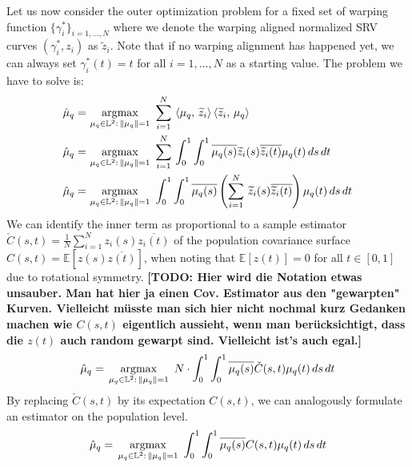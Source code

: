 Let us now consider the outer optimization problem for a fixed set of warping function $\{\gamma_i^*\}_{i=1,\dots,N}$ where we denote the warping aligned normalized SRV curves $(\gamma_i^*, z_i)$ as $\widetilde{z}_i$.
Note that if no warping alignment has happened yet, we can always set $\gamma_i^*(t) = t$ for all $i=1,\dots,N$ as a starting value.
The problem we have to solve is:
\begin{align*}
  \hat\mu_q = &\, \operatorname*{argmax}_{\mu_q \in \mathbb{L}^2:\,\lVert\mu_q\rVert = 1}\,\,
    \sum_{i=1}^N \, \left\langle \mu_q,\, \widetilde z_i \right\rangle \left\langle \widetilde z_i,\, \mu_q \right\rangle \\
  \hat\mu_q = &\, \operatorname*{argmax}_{\mu_q \in \mathbb{L}^2:\,\lVert\mu_q\rVert = 1}\,\,
    \sum_{i=1}^N \, \int_0^1 \int_0^1 \overline{\mu_q (s)} \widetilde z_i(s) \overline{\widetilde z_i(t)} \mu_q(t) \,ds\,dt \\
  \hat\mu_q = &\, \operatorname*{argmax}_{\mu_q \in \mathbb{L}^2:\,\lVert\mu_q\rVert = 1}\,\,
    \int_0^1 \int_0^1 \overline{\mu_q (s)} \left( \sum_{i=1}^N\, \widetilde z_i(s) \overline{ \widetilde z_i(t)} \right) \mu_q(t) \,ds\,dt
\end{align*}
We can identify the inner term as proportional to a sample estimator $\check{C}(s,t) = \frac{1}{N} \sum_{i=1}^N z_i(s) \overline{z_i(t)}$ of the population covariance surface $C(s,t) = \mathbb{E}[z(s) \overline{z(t)}]$, when noting that $\mathbb{E}[z(t)] = 0$ for all $t \in [0,1]$ due to rotational symmetry.
\textbf{[TODO: Hier wird die Notation etwas unsauber. Man hat hier ja einen Cov. Estimator aus den "gewarpten" Kurven. Vielleicht müsste man sich hier nicht nochmal kurz Gedanken machen wie $C(s,t)$ eigentlich aussieht, wenn man berücksichtigt, dass die $z(t)$ auch random gewarpt sind. Vielleicht ist's auch egal.]}
$$ \hat\mu_q = \, \operatorname*{argmax}_{\mu_q \in \mathbb{L}^2:\,\lVert\mu_q\rVert = 1}\,\,
    N\cdot\int_0^1 \int_0^1 \overline{\mu_q (s)} \check C(s,t) \mu_q(t) \,ds\,dt $$
By replacing $\check C(s,t)$ by its expectation $C(s,t)$, we can analogously formulate an estimator on the population level.
$$ \hat\mu_q = \, \operatorname*{argmax}_{\mu_q \in \mathbb{L}^2:\,\lVert\mu_q\rVert = 1}\,\,
    \int_0^1 \int_0^1 \overline{\mu_q (s)} C(s,t) \mu_q(t) \,ds\,dt $$

